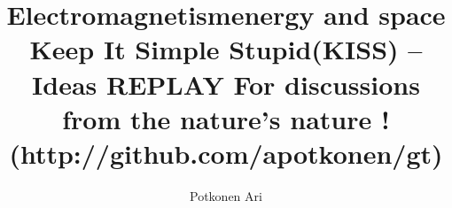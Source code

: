 \documentclass[a5paper,final]{memoir}
\begin{document}
\title{\Huge\textbf{Electromagnetism\linebreak energy and space}
\linebreak Keep It Simple Stupid\linebreak (KISS) -- Ideas \linebreak
\linebreak REPLAY \linebreak
\linebreak \linebreak
\linebreak
\small
For discussions from the nature's nature !\linebreak
(http://github.com/apotkonen/gt)
}
\author{\Large Potkonen Ari}
\maketitle
\pagebreak
\pagestyle{plain}
\parindent 0pt
\setcounter{page}{1}
\pagebreak %
\tableofcontents
\listoffigures
\vspace*{\fill}
\pagebreak %
\pagestyle{headings}
\setcounter{page}{1}
\parindent 0pt
\end{document}

